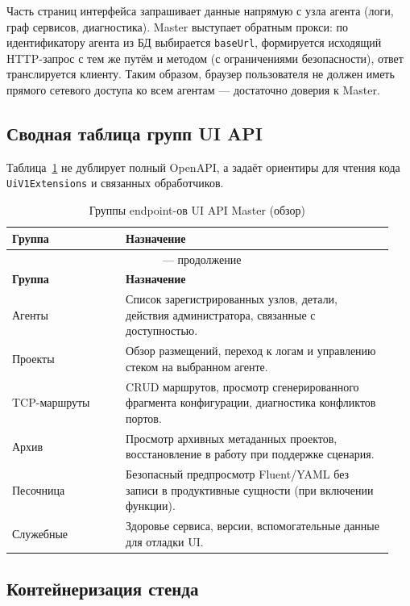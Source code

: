 Часть страниц интерфейса запрашивает данные напрямую с узла агента (логи, граф сервисов, диагностика). Master выступает обратным прокси: по идентификатору агента из БД выбирается \texttt{baseUrl}, формируется исходящий HTTP-запрос с тем же путём и методом (с ограничениями безопасности), ответ транслируется клиенту. Таким образом, браузер пользователя не должен иметь прямого сетевого доступа ко всем агентам --- достаточно доверия к Master.

\subsection{Сводная таблица групп UI API}

Таблица~\ref{tab:ui-api-groups} не дублирует полный OpenAPI, а задаёт ориентиры для чтения кода \texttt{UiV1Extensions} и связанных обработчиков.

{\small
\begin{longtable}{@{}p{0.28\linewidth}p{0.66\linewidth}@{}}
\caption{Группы endpoint-ов UI API Master (обзор)} \label{tab:ui-api-groups} \\
\toprule
\textbf{Группа} & \textbf{Назначение} \\
\midrule
\endfirsthead
\multicolumn{2}{c}{\tablename\ \thetable{} --- продолжение} \\
\toprule
\textbf{Группа} & \textbf{Назначение} \\
\midrule
\endhead
Агенты & Список зарегистрированных узлов, детали, действия администратора, связанные с доступностью. \\
Проекты & Обзор размещений, переход к логам и управлению стеком на выбранном агенте. \\
TCP-маршруты & CRUD маршрутов, просмотр сгенерированного фрагмента конфигурации, диагностика конфликтов портов. \\
Архив & Просмотр архивных метаданных проектов, восстановление в работу при поддержке сценария. \\
Песочница & Безопасный предпросмотр Fluent/YAML без записи в продуктивные сущности (при включении функции). \\
Служебные & Здоровье сервиса, версии, вспомогательные данные для отладки UI. \\
\bottomrule
\end{longtable}
}

\subsection{Контейнеризация стенда}


